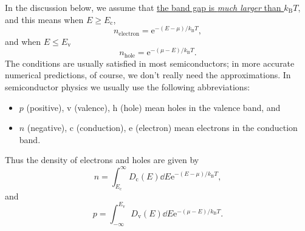 \documentclass[hyperref, a4paper]{article}
\newcommand*{\ee}{\mathrm{e}}
\begin{document}
In the discussion below, we assume that 
\ul{the band gap is \emph{much larger} than $k_{\text{B}} T$},
and this means when $E \geq E_{\text{c}}$,
\begin{equation}
    n_{\text{electron}} = \ee^{- (E - \mu) / k_{\text{B}} T},
\end{equation}
and when $E \leq E_{\text{v}}$
\begin{equation}
    n_{\text{hole}} = \ee^{- (\mu - E) / k_{\text{B}} T}.
\end{equation}
The conditions are usually satisfied 
in most semiconductors; 
in more accurate numerical predictions, of course, 
we don't really need the approximations. 
In semiconductor physics we usually use the following abbreviations:
\begin{itemize}
    \item $p$ (positive), v (valence), h (hole) mean holes in the valence band, and 
    \item $n$ (negative), c (conduction), e (electron) mean electrons in the conduction band.
\end{itemize}
Thus the density of electrons and holes are given by 
\begin{equation}
    n = \int_{E_\text{c}}^\infty D_{\text{c}} (E) \dd{E} \ee^{- (E - \mu) / k_{\text{B}} T},
\end{equation}
and 
\begin{equation}
    p = \int^{E_{\text{v}}}_{-\infty} D_{\text{v}} (E) \dd{E} \ee^{- (\mu - E) / k_{\text{B}} T}.
\end{equation}
\end{document}
